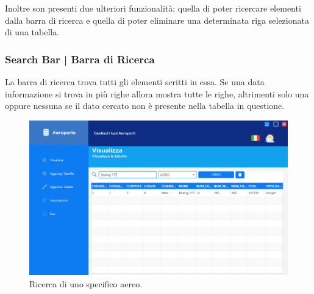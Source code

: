 \textsf{\small Inoltre son presenti due ulteriori funzionalità: quella di poter ricercare elementi dalla barra di ricerca e quella di poter eliminare una determinata riga selezionata di una tabella.}\\


\pagebreak


\subsubsection{Search Bar | Barra di Ricerca}

\textsf{\small La barra di ricerca trova tutti gli elementi scritti in essa. Se una data informazione si trova in più righe allora mostra tutte le righe, altrimenti solo una oppure nessuna se il dato cercato non è presente nella tabella in questione.}

\begin{figure}[H] 
	\centering
	\includegraphics[width=1\textwidth, height=1\textheight, keepaspectratio]{./img/Applicativo/search_bar2.png}
	\caption{Ricerca di uno specifico aereo.}
	\label{fig:search_bar2}
\end{figure}

